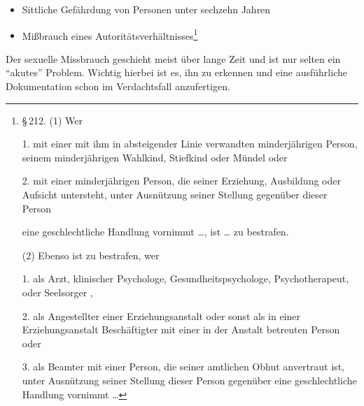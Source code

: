 \begin{itemize}
{  (2) Wer an einer Person, die das 16. Lebensjahr noch nicht
  vollendet hat,  dieser
  Person eine geschlechtliche Handlung vornimmt, {\ldots}, ist
  {\ldots} zu bestrafen.
  
  (3) Wer eine Person, die das 18. Lebensjahr noch nicht
  vollendet hat, unmittelbar durch ein Entgelt dazu verleitet,
  eine geschlechtliche Handlung {\ldots} vorzunehmen {\ldots},
  ist {\ldots} zu bestrafen.
  } \item Sittliche Gefährdung von Personen unter sechzehn
  Jahren
  \item Mißbrauch eines Autoritätsverhältnisses\footnote{%
  {\S}\,212. (1) Wer
  
  1. mit einer mit ihm in absteigender Linie verwandten minderjährigen Person, seinem
  minderjährigen Wahlkind, Stiefkind oder Mündel oder
  
  2. mit einer minderjährigen Person, die seiner Erziehung, Ausbildung oder Aufsicht
  untersteht, unter Ausnützung seiner Stellung gegenüber dieser Person
  
  eine geschlechtliche Handlung vornimmt {\ldots}, ist {\ldots} zu bestrafen.
  
  (2) Ebenso ist zu bestrafen, wer
  
  1. als Arzt, klinischer Psychologe, Gesundheitspsychologe, Psychotherapeut,
   oder Seelsorger
  ,
  
  2. als Angestellter einer Erziehungsanstalt oder sonst als in einer
  Erziehungsanstalt Beschäftigter mit einer in der Anstalt betreuten Person oder
  
  3. als Beamter mit einer Person, die seiner amtlichen Obhut anvertraut ist,
  unter Ausnützung seiner Stellung dieser Person gegenüber eine geschlechtliche
  Handlung vornimmt {\ldots}
  }
\end{itemize}
Der sexuelle Missbrauch geschieht meist über lange Zeit und
ist nur selten ein \enquote{akutes} Problem. Wichtig hierbei ist
es, ihn zu erkennen und eine ausführliche Dokumentation
schon im Verdachtsfall anzufertigen.

